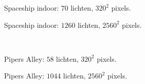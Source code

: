 \begin{figure}[t]
  \begin{adjustbox}{minipage=\textwidth, scale=0.6}
    \begin{subfigure}[b]{0.83\textwidth}
      \centering
      \def\svgwidth{\textwidth}
      
      \caption{Spaceship indoor: $70$ lichten, $320^2$ pixels.}
      \label{fig:hs-exec-frames-deferred:indoor-low}
    \end{subfigure}
  \end{adjustbox} %
  \begin{adjustbox}{minipage=\textwidth, scale=0.6}
    \begin{subfigure}[b]{0.83\textwidth}
      \centering
      \def\svgwidth{\textwidth}
      
      \caption{Spaceship indoor: $1260$ lichten, $2560^2$ pixels.}
      \label{fig:hs-exec-frames-deferred:indoor-high}
    \end{subfigure}
  \end{adjustbox} \\
  \begin{adjustbox}{minipage=\textwidth, scale=0.6}
    \begin{subfigure}[b]{0.83\textwidth}
      \centering
      \def\svgwidth{\textwidth}
      
      \caption{Pipers Alley: $58$ lichten, $320^2$ pixels.}
      \label{fig:hs-exec-frames-deferred:alley-low}
    \end{subfigure}
  \end{adjustbox} %
  \begin{adjustbox}{minipage=\textwidth, scale=0.6}
    \begin{subfigure}[b]{0.83\textwidth}
      \centering
      \def\svgwidth{\textwidth}
      
      \caption{Pipers Alley: $1044$ lichten, $2560^2$ pixels.}
      \label{fig:hs-exec-frames-deferred:alley-high}
    \end{subfigure}
  \end{adjustbox} \\
  \begin{adjustbox}{minipage=\textwidth, scale=0.6}
    \begin{subfigure}[b]{0.83\textwidth}
      \centering
      \def\svgwidth{\textwidth}
      

\end{subfigure}
\end{adjustbox}
\end{figure}

